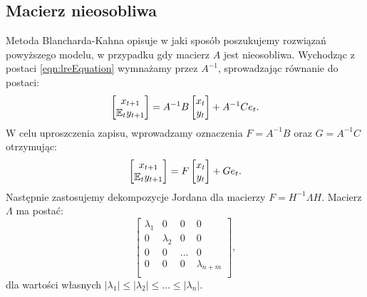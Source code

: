 \subsection{Macierz nieosobliwa}
\label{sec:bk_nieosobliwa}

Metoda Blancharda-Kahna opisuje w jaki sposób poszukujemy rozwiązań powyższego modelu, w przypadku gdy macierz $A$ jest nieosobliwa. Wychodząc z postaci \eqref{eqn:lreEquation} wymnażamy przez $A^{-1}$, sprowadzając równanie do postaci:
\begin{equation}
    \begin{bmatrix}
    x_{t+1} \\
    \mathbb{E}_t y_{t+1}
\end{bmatrix} = A^{-1}B \begin{bmatrix}
    x_{t} \\
    y_{t}
\end{bmatrix} + A^{-1} C e_t.
\end{equation}
W celu uproszczenia zapisu, wprowadzamy oznaczenia $F = A^{-1} B$ oraz $G = A^{-1} C$ otrzymując:
\begin{equation}
    \label{eqn:bkFG}
    \begin{bmatrix}
    x_{t+1} \\
    \mathbb{E}_t y_{t+1}
\end{bmatrix} = F \begin{bmatrix}
    x_{t} \\
    y_{t}
\end{bmatrix} + G e_t.
\end{equation}
Następnie zastosujemy dekompozycje Jordana dla macierzy $F = H^{-1} \Lambda H$. Macierz $\Lambda$ ma postać:
\begin{equation}
    \begin{bmatrix}
        \lambda_1 & 0 & 0 & 0 \\
        0 & \lambda_2 & 0 & 0 \\
        0 & 0 & \dots & 0 \\
        0 & 0 & 0 & \lambda_{n+m} \\
    \end{bmatrix},
\end{equation}
dla wartości własnych $ |\lambda_1| \leq |\lambda_2| \leq \dots \leq |\lambda_n|$.

